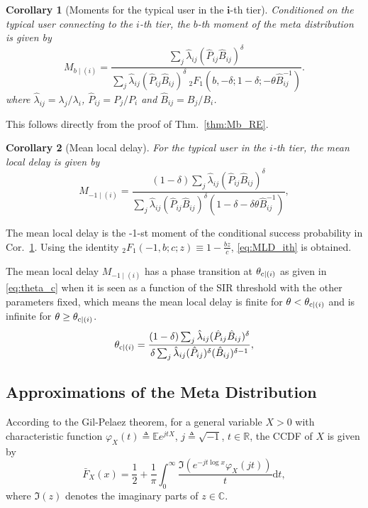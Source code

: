 \documentclass[12pt,draftclsnofoot,journal,onecolumn]{IEEEtran}
\def\E{\mathbb{E}}
\def\R{\mathbb{R}}
\def\dd{\mathrm{d}}
\newtheorem{corollary}{Corollary}
\begin{document}
\begin{corollary}[Moments for the typical user in the $\bm i$-th tier]
	\label{thm:Mb-ith-tier}
	Conditioned on the typical user connecting to the $i$-th tier, the $b$-th moment of the meta distribution is given by
	\begin{equation}\label{eq:Mb-ith-tier}
	M_{b \mid (i)} = \frac{\sum_{j} \hat{\lambda}_{ij}(\hat{P}_{ij}\hat{B}_{ij})^\delta}{\sum_j \hat{\lambda}_{ij}(\hat{P}_{ij}\hat{B}_{ij})^\delta ~_2F_1(b,-\delta; 1-\delta; -\theta \hat B_{ij}^{-1})}.
	\end{equation}
	where $\hat\lambda_{ij} = \lambda_j/\lambda_i$, $\hat P_{ij} = P_j/P_i$ and $\hat B_{ij} = B_j/B_i$.
\end{corollary}   
\begin{IEEEproof}
This follows directly from the proof of Thm.~\ref{thm:Mb_RE}.
\end{IEEEproof}

\begin{corollary}[Mean local delay]
	For the typical user in the $i$-th tier, the mean local delay is given by
	\begin{equation}\label{eq:MLD_ith}
	M_{-1\mid (i)} = \frac{(1-\delta)\sum_j \hat \lambda_{ij} (\hat P_{ij} \hat B_{ij})^\delta}{\sum_j \hat \lambda_{ij} (\hat P_{ij} \hat B_{ij})^\delta (1-\delta-\delta\theta \hat B_{ij}^{-1})},
	\end{equation}
\end{corollary}
\begin{IEEEproof}
	The mean local delay is the -1-st moment of the conditional success probability in Cor.~\ref{thm:Mb-ith-tier}. Using the identity $_2F_1(-1,b;c;z) \equiv 1-\frac{bz}{c}$, \eqref{eq:MLD_ith} is obtained.
\end{IEEEproof}

The mean local delay $M_{-1\mid (i)}$ has a phase transition at $\theta_{{\rm c}\mid(i)}$ as given in \eqref{eq:theta_c} when it is seen as a function of the SIR threshold with the other parameters fixed, which means the mean local delay is finite for $\theta < \theta_{{\rm c}\mid(i)}$ and is infinite for $\theta \geq \theta_{{\rm c}\mid(i)}$.
\begin{equation}\label{eq:theta_c}
\theta_{{\rm c}\mid(i)}=\frac{(1-\delta)\sum_j \hat \lambda_{ij} (\hat P_{ij} \hat B_{ij})^\delta}{\delta \sum_j \hat \lambda_{ij} (\hat P_{ij})^\delta (\hat B_{ij})^{\delta-1}},
\end{equation}

\subsection{Approximations of the Meta Distribution}
According to the Gil-Pelaez theorem\cite{gil1951note}, for a general variable $X>0$ with characteristic function $\varphi_X(t)\triangleq\E e^{jtX}$, $j\triangleq\sqrt{-1}$, $t\in\R$, the CCDF of $X$ is given by 
\begin{equation}\label{eq:Gil}
\bar F_X(x)=\frac12+\frac1\pi\int_0^\infty \frac{\Im(e^{-jt\log x}\varphi_X(jt))}{t}\dd t, 
\end{equation}
where $\Im(z)$ denotes the imaginary parts of $z\in\mathbb{C}$.
\end{document}
